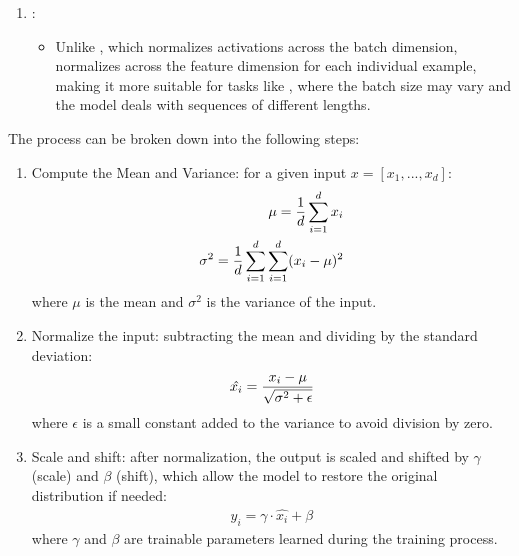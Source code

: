 \documentclass[letterpaper,11pt,english]{sphinxmanual}
\begin{document}
\begin{enumerate}
\begin{itemize}
\end{itemize}

\item {} 
\sphinxAtStartPar
{}:
\begin{itemize}
\item {} 
\sphinxAtStartPar
Unlike , which normalizes activations across
the batch dimension,  normalizes across the
feature dimension for each individual example, making it more
suitable for tasks like , where the batch size
may vary and the model deals with sequences of different lengths.

\end{itemize}

\end{enumerate}

\sphinxAtStartPar
The process can be broken down into the following steps:
\begin{enumerate}
%
\item {} 
\sphinxAtStartPar
Compute the Mean and Variance: for a given input
\(x = [x_1, ..., x_d]\):
\begin{equation*}
\begin{split}\mu = {1\over d} \sum^d_{i=1}x_i\\
\sigma^2 = {1\over d} \sum^d_{i=1} \sum^d_{i=1} (x_i-\mu)^2\end{split}
\end{equation*}
\sphinxAtStartPar
where \(\mu\) is the mean and \(\sigma^2\) is the variance of
the input.

\item {} 
\sphinxAtStartPar
Normalize the input: subtracting the mean and dividing by the
standard deviation:
\begin{equation*}
\begin{split}\hat{x_i} = { x_i - \mu \over \sqrt{\sigma^2 + \epsilon}}\end{split}
\end{equation*}
\sphinxAtStartPar
where \(\epsilon\) is a small constant added to the variance to
avoid division by zero.

\item {} 
\sphinxAtStartPar
Scale and shift: after normalization, the output is scaled and
shifted by  \(\gamma\) (scale) and
\(\beta\) (shift), which allow the model to restore the original
distribution if needed:
\begin{equation*}
\begin{split}y_i = \gamma \cdot \hat{x_i} + \beta\end{split}
\end{equation*}
\sphinxAtStartPar
where \(\gamma\) and \(\beta\) are trainable parameters
learned during the training process.

\end{enumerate}
\end{document}
